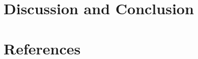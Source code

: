 \documentclass[12pt]{article}
\begin{document}
\section{Discussion and Conclusion}
\label{sec:disc}



\section{References}
\label{sec:refer}



\cite{singh2021machlearn}
\cite{alfiyantin2017regress}



\end{document}
